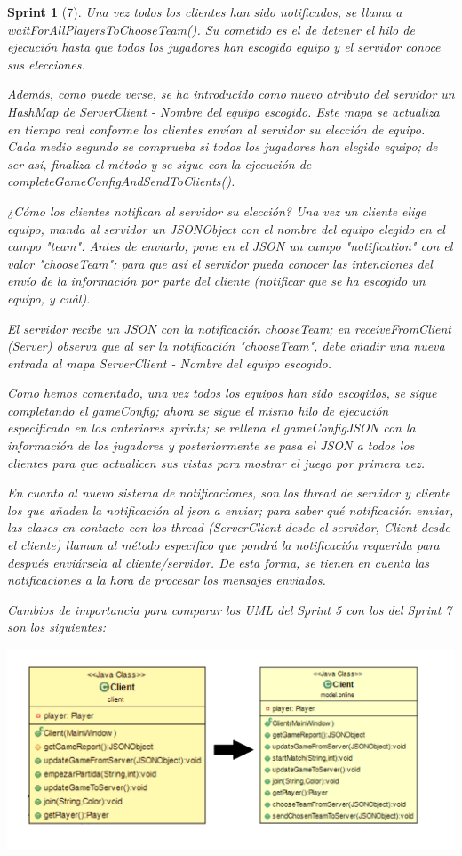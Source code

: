 \documentclass{article}
\theoremstyle{break}
\newtheorem*{sprint}{Sprint}
\begin{document}
\begin{sprint}[7]
Una vez todos los clientes han sido notificados, se llama a waitForAllPlayersToChooseTeam(). Su cometido es el de detener el hilo de ejecución hasta que todos los jugadores han escogido equipo y el servidor conoce sus elecciones.

Además, como puede verse, se ha introducido como nuevo atributo del servidor un HashMap de ServerClient - Nombre del equipo escogido. Este mapa se actualiza en tiempo real conforme los clientes envían al servidor su elección de equipo. Cada medio segundo se comprueba si todos los jugadores han elegido equipo; de ser así, finaliza el método y se sigue con la ejecución de completeGameConfigAndSendToClients().

¿Cómo los clientes notifican al servidor su elección? Una vez un cliente elige equipo, manda al servidor un JSONObject con el nombre del equipo elegido en el campo "team". Antes de enviarlo, pone en el JSON un campo "notification" con el valor "chooseTeam"; para que así el servidor pueda conocer las intenciones del envío de la información por parte del cliente (notificar que se ha escogido un equipo, y cuál).

El servidor recibe un JSON con la notificación chooseTeam; en receiveFromClient (Server) observa que al ser la notificación "chooseTeam", debe añadir una nueva entrada al mapa ServerClient - Nombre del equipo escogido.

Como hemos comentado, una vez todos los equipos han sido escogidos, se sigue completando el gameConfig; ahora se sigue el mismo hilo de ejecución especificado en los anteriores sprints; se rellena el gameConfigJSON con la información de los jugadores y posteriormente se pasa el JSON a todos los clientes para que actualicen sus vistas para mostrar el juego por primera vez.

En cuanto al nuevo sistema de notificaciones, son los thread de servidor y cliente los que añaden la notificación al json a enviar; para saber qué notificación enviar, las clases en contacto con los thread (ServerClient desde el servidor, Client desde el cliente) llaman al método especifico que pondrá la notificación requerida para después enviársela al cliente/servidor. De esta forma, se tienen en cuenta las notificaciones a la hora de procesar los mensajes enviados.

Cambios de importancia para comparar los UML del Sprint 5 con los del Sprint 7 son los siguientes:

\begin{center}
\includegraphics[scale=0.3]{Client-evol.png} 
\end{center}


\end{sprint}
\end{document}
